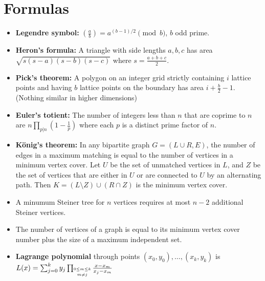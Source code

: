 \section{Formulas}



  \begin{itemize}[leftmargin=*]
    \item \textbf{Legendre symbol:} $\left(\frac{a}{b}\right) = a^{(b-1)/2} \pmod{b}$, $b$ odd prime.
    \item \textbf{Heron's formula:} A triangle with side lengths
      $a,b,c$ has area $\sqrt{s(s-a)(s-b)(s-c)}$ where $s =
      \frac{a+b+c}{2}$.
    \item \textbf{Pick's theorem:} A polygon on an integer grid
      strictly containing $i$ lattice points and having $b$ lattice
      points on the boundary has area $i + \frac{b}{2} - 1$. (Nothing
      similar in higher dimensions)
    \item \textbf{Euler's totient:} The number of integers less than
      $n$ that are coprime to $n$ are $n\prod_{p|n}\left(1 - \frac{1}{p}\right)$
      where each $p$ is a distinct prime factor of $n$.
    \item \textbf{König's theorem:} In any bipartite graph $G=(L\cup R,E)$, the number
      of edges in a maximum matching is equal to the number of
      vertices in a minimum vertex cover. Let $U$ be the set of
      unmatched vertices in $L$, and $Z$ be the set of vertices that
      are either in $U$ or are connected to $U$ by an alternating
      path. Then $K=(L\setminus Z)\cup(R\cap Z)$ is the minimum
      vertex cover.
    \item A minumum Steiner tree for $n$ vertices requires at most $n-2$ additional Steiner vertices.
    \item The number of vertices of a graph is equal to its minimum
      vertex cover number plus the size of a maximum independent set.
    \item \textbf{Lagrange polynomial} through points $(x_0,y_0),\ldots,(x_k,y_k)$ is $L(x) = \sum_{j=0}^k y_j \prod_{\shortstack{$\scriptscriptstyle 0\leq m \leq k$ \\ $\scriptscriptstyle m\neq j$}} \frac{x-x_m}{x_j - x_m}$

\end{itemize}
